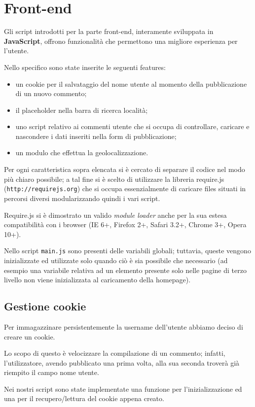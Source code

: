 \section{Front-end}
Gli script introdotti per la parte front-end, interamente sviluppata in
\textbf{JavaScript}, offrono funzionalità che permettono una migliore
esperienza per l'utente.


Nello specifico sono state inserite le seguenti features:
\begin{itemize}
\item un cookie per il salvataggio del nome utente al momento della
pubblicazione di un nuovo commento;
\item il placeholder nella barra di ricerca località;
\item uno script relativo ai commenti utente che si occupa di controllare,
caricare e nascondere i dati inseriti nella form di pubblicazione;
\item un modulo che effettua la geolocalizzazione.
\end{itemize} 
Per ogni caratteristica sopra elencata si è cercato di separare il codice nel
modo più chiaro possibile; a tal fine si è scelto di utilizzare la libreria
require.js (\texttt{http://requirejs.org}) che si occupa essenzialmente di
caricare files situati in percorsi diversi modularizzando quindi i vari
script.

Require.js si è dimostrato un valido \textit{module loader} anche per la sua
estesa compatibilità con i browser (IE 6+, Firefox 2+, Safari 3.2+, Chrome
3+, Opera 10+).

Nello script \texttt{main.js} sono presenti delle variabili globali; tuttavia,
queste vengono inizializzate ed utilizzate solo quando ciò è sia possibile che
necessario (ad esempio una variabile relativa ad un elemento presente solo
nelle pagine di terzo livello non viene inizializzata al caricamento della
homepage).

\subsection{Gestione cookie}
Per immagazzinare persistentemente la username dell'utente abbiamo deciso di
creare un cookie.

Lo scopo di questo è velocizzare la compilazione di un commento; infatti,
l'utilizzatore, avendo pubblicato una prima volta, alla sua seconda troverà
già riempito il campo nome utente.

Nei nostri script sono state implementate una funzione per l'inizializzazione
ed una per il recupero/lettura del cookie appena creato.

